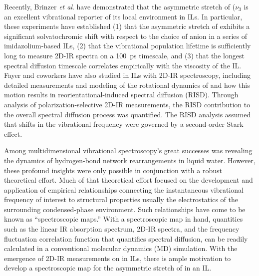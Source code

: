 \documentclass[%
  class = book,%
  crop = false,%
  float = true,%
  multi = true,%
  preview = false,%
]{standalone}
\begin{document}
Recently, Brinzer \emph{et al}. have demonstrated that the asymmetric stretch of  (\(\nu_3\) is an excellent vibrational reporter of its local environment in ILs.\cite{Brinzer2015} In particular, these experiments have established (1) that the asymmetric stretch of  exhibits a significant solvatochromic shift with respect to the choice of anion in a series of imidazolium-based ILs, (2) that the  vibrational population lifetime is sufficiently long to measure 2D-IR spectra on a \SI{100}{\pico\second} timescale, and (3) that the longest spectral diffusion timescale correlates empirically with the viscosity of the IL.\cite{Brinzer2015} Fayer and coworkers have also studied  in ILs with 2D-IR spectroscopy, including detailed measurements and modeling of the rotational dynamics of  and how this motion results in reorientational-induced spectral diffusion (RISD). Through analysis of polarization-selective 2D-IR measurements, the RISD contribution to the overall spectral diffusion process was quantified.\cite{Giammanco2016d,Giammanco2016} The RISD analysis assumed that shifts in the  vibrational frequency were governed by a second-order Stark effect.

Among multidimensional vibrational spectroscopy's great successes was revealing the dynamics of hydrogen-bond network rearrangements in liquid water.\cite{asburyJCP-04,Asbury2004,Bakker2010,feckoSci-03,eavesPNAS-05,Gruenbaum2013,Jansen2010,loparoJCP-06a,loparoJCP-06b,Nibbering2004,Nicodemus2011,nicodemusJPCL-10,ramaseshaJCP-11,Roberts2009} However, these profound insights were only possible in conjunction with a robust theoretical effort.\cite{Lee2011,feckoSci-03,eavesPNAS-05,Gruenbaum2013,auer_hydrogen_2007,auer_ir_2008,corcelliJCP-04a,Hayashi2005,Jansen2009,Li2010,Chai2008,lin_water_2009-1,Paarmann2009,Pieniazek2009,shiJPCB-12,Skinner2009,Tainter2012,Yang2011,laageCPL-06,Laage2006,Laage2008,Laage2012,Laage2012a,Smith2005} Much of that theoretical effort focused on the development and application of empirical relationships connecting the instantaneous vibrational frequency of interest to structural properties \textemdash{} usually the electrostatics \textemdash{} of the surrounding condensed-phase environment.\cite{steinelCPL-04,auer_ir_2008,Li2006} Such relationships have come to be known as ``spectroscopic maps.'' With a spectroscopic map in hand, quantities such as the linear IR absorption spectrum, 2D-IR spectra, and the frequency fluctuation correlation function that quantifies spectral diffusion, can be readily calculated in a conventional molecular dynamics (MD) simulation.\cite{lin_water_2009-1,Li2006,Terranova2014} With the emergence of 2D-IR measurements on  in ILs, there is ample motivation to develop a spectroscopic map for the asymmetric stretch of  in an IL.
\end{document}
